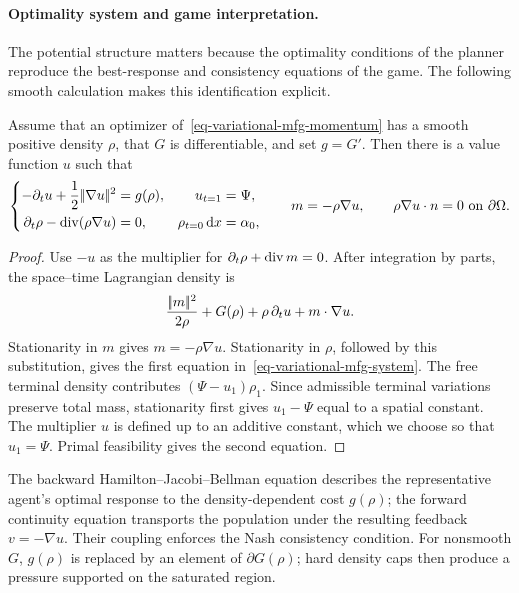 \paragraph{Optimality system and game interpretation.}
The potential structure matters because the optimality conditions of the planner reproduce the best-response and consistency equations of the game. The following smooth calculation makes this identification explicit.

\begin{prop}\label{prop-variational-mfg-system}
	Assume that an optimizer of~\eqref{eq-variational-mfg-momentum} has a smooth positive density $\rho$, that $G$ is differentiable, and set $g=G'$. Then there is a value function $u$ such that
	\begin{equation}\label{eq-variational-mfg-system}
		\left\{
		\begin{aligned}
			-\partial_tu+\frac12|\!| \nabla u |\!|^2&=g(\rho),
			& u_{t=1}&=\Psi,\\
			\partial_t\rho-\operatorname{div}(\rho\nabla u)&=0,
			& \rho_{t=0}\,\mathrm{d} x&=\alpha_0,
		\end{aligned}
		\right.
		\qquad
		m=-\rho\nabla u,
		\qquad
		\rho\nabla u\cdot n=0\ \text{on }\partial\Omega.
	\end{equation}
\end{prop}

\begin{proof}
	Use $-u$ as the multiplier for $\partial_t\rho+\operatorname{div} m=0$. After integration by parts, the space--time Lagrangian density is
	\[
		\frac{|\!| m |\!|^2}{2\rho}+G(\rho)
		+\rho\,\partial_tu+m\cdot\nabla u.
	\]
	Stationarity in $m$ gives $m=-\rho\nabla u$. Stationarity in $\rho$, followed by this substitution, gives the first equation in~\eqref{eq-variational-mfg-system}. The free terminal density contributes $(\Psi-u_1)\rho_1$. Since admissible terminal variations preserve total mass, stationarity first gives $u_1-\Psi$ equal to a spatial constant. The multiplier $u$ is defined up to an additive constant, which we choose so that $u_1=\Psi$. Primal feasibility gives the second equation.
\end{proof}

The backward Hamilton--Jacobi--Bellman equation describes the representative agent's optimal response to the density-dependent cost $g(\rho)$; the forward continuity equation transports the population under the resulting feedback $v=-\nabla u$. Their coupling enforces the Nash consistency condition. For nonsmooth $G$, $g(\rho)$ is replaced by an element of $\partial G(\rho)$; hard density caps then produce a pressure supported on the saturated region.

